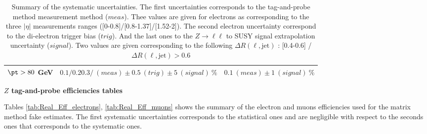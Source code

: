 \begin{table}[htb!]
\begin{center}
\begin{tabular}{|l|c|c|}
	     \hline                                                                            
		 $\pt > 80$ GeV       & $0.1/0.20.3/~(meas) \pm 0.5~(trig) \pm 5~(signal)~\%$ & $0.1~(meas) \pm 1 ~(signal)~\%$\\
	     \hline
	\end{tabular}
        \end{center}
	\caption{ \label{tab:Real_Eff_Syst_tot} Summary of the systematic uncertainties. The first uncertainties corresponds to the tag-and-probe method measurement method ($meas$). Thee values are given for electrons as corresponding to the three $|\eta|$ measurements ranges ([0-0.8]/[0.8-1.37]/[1.52-2]). The second electron uncertainty correspond to the di-electron trigger bias ($trig$). And the last ones to the $Z\rightarrow \ell\ell$ to SUSY signal extrapolation uncertainty ($signal$). Two values are given corresponding to the following $\Delta R(\ell,\mathrm{jet})$ : [0.4-0.6] / $\Delta R(\ell,\mathrm{jet}) > 0.6$}
\end{table}

                                                                   

       \par{\bf $Z$ tag-and-probe efficiencies tables \\}

       Tables \ref{tab:Real_Eff_electrons}, \ref{tab:Real_Eff_muons} shows the summary of the electron and muons efficiencies used for the matrix method fake estimates. The first systematic uncertainties corresponds to the statistical ones and are negligible with respect to the seconds ones that corresponds to the systematic ones. 


